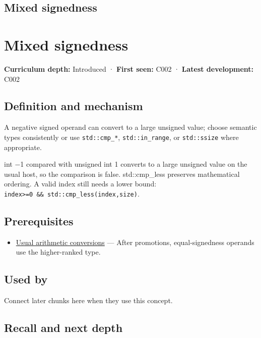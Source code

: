 \hypertarget{appendix-736a2345de4a}{}
\section*{Mixed signedness}
\chapter{Mixed signedness}\label{appendix-736a2345de4a-mixed-signedness}

\textbf{Curriculum depth:} Introduced · \textbf{First seen:} C002 · \textbf{Latest development:} C002

\section{Definition and mechanism}\label{appendix-736a2345de4a-definition-and-mechanism}

A negative signed operand can convert to a large unsigned value; choose semantic types consistently or use \texttt{std::cmp\_*}, \texttt{std::in\_range}, or \texttt{std::ssize} where appropriate.

int −1 compared with unsigned int 1 converts to a large unsigned value on the usual host, so the comparison is false. std::cmp\_less preserves mathematical ordering. A valid index still needs a lower bound: \texttt{index\textgreater{}=0\ \&\&\ std::cmp\_less(index,size)}.

\section{Prerequisites}\label{appendix-736a2345de4a-prerequisites}

\begin{itemize}
\tightlist
\item
  \hyperref[appendix-5e2d663adf7f]{Usual arithmetic conversions} --- After promotions, equal-signedness operands use the higher-ranked type.
\end{itemize}

\section{Used by}\label{appendix-736a2345de4a-used-by}

Connect later chunks here when they use this concept.

\section{Recall and next depth}\label{appendix-736a2345de4a-recall-and-next-depth}

